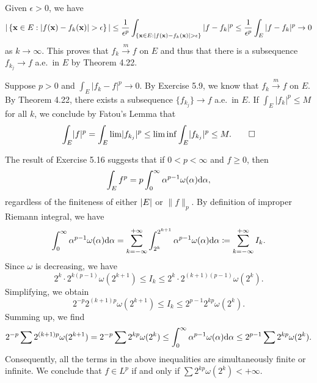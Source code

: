 \begin{exercise}{5.9}
  Given $\epsilon>0$, we have
  \[|\left\{\bfx\in E:|f(\bfx)-f_k(\bfx)|>\epsilon\right\}|\leq\frac{1}{\epsilon^p}\int_{\{\bfx\in E:|f(\bfx)-f_k(\bfx)|>\epsilon\}}|f-f_k|^p\leq\frac{1}{\epsilon^p}\int_E|f-f_k|^p \to 0 \]
  as $k\to\infty$.
  This proves that $f_k\overset{m}{\longrightarrow} f$ on $E$ and thus
  that there is a subsequence $f_{k_j}\to f$ a.e.\ in $E$ by Theorem 4.22.
\end{exercise}

\begin{exercise}{5.10}
  Suppose $p > 0$ and $\int_E \lvert f_k - f \rvert^p \rightarrow 0$.
  By Exercise 5.9, we know that $f_k \xrightarrow{m} f$ on $E$.
  By Theorem 4.22, there exists a subsequence $\{f_{k_j}\} \rightarrow f$ a.e.\ in $E$.
  If $\int_E \lvert f_k \rvert^p \le M$ for all $k$,
  we conclude by Fatou's Lemma that
  \[
    \int_E \lvert f \rvert^p = \int_E \lim \lvert f_{k_j} \rvert^p
    \le \liminf \int_E \lvert f_{k_j} \rvert^p \le M.
    \qedhere
  \]
\end{exercise}

\begin{exercise}{5.18}
  The result of Exercise 5.16 suggests that if $0 < p < \infty$ and $f \ge 0$, then
  \[
    \int_E f^p = p \int_0^{\infty} \alpha^{p-1} \omega(\alpha) \mathrm{d} \alpha,
  \]
  regardless of the finiteness of either $\left\vert E\right\vert$ or $\lVert f \rVert_p$.
  By definition of improper Riemann integral, we have
  \[
    \int_0^\infty \alpha^{p-1} \omega(\alpha) \mathrm{d} \alpha =
    \sum_{k = -\infty}^{+\infty}
    \int_{2^k}^{2^{k+1}} \alpha^{p-1} \omega(\alpha) \mathrm{d} \alpha
    \coloneqq \sum_{k = -\infty}^{+\infty} I_k.
  \]
  Since $\omega$ is decreasing, we have
  \[
    2^k \cdot 2^{k(p-1)} \omega(2^{k+1}) \le I_k \le 2^k \cdot 2^{(k+1)(p-1)} \omega(2^k).
  \]
  Simplifying, we obtain
  \[
    2^{-p} 2^{(k+1)p} \omega(2^{k+1}) \le I_k \le 2^{p-1} 2^{kp} \omega(2^k).
  \]
  Summing up, we find
  \[
    2^{-p} \sum 2^{(k+1)p} \omega(2^{k+1})
    = 2^{-p} \sum 2^{kp} \omega(2^k)
    \le \int_0^\infty \alpha^{p-1} \omega(\alpha) \mathrm{d} \alpha
    \le 2^{p-1} \sum 2^{kp} \omega(2^k).
  \]
  Consequently, all the terms in the above inequalities
  are simultaneously finite or infinite.
  We conclude that $f \in L^p$ if and only if $\sum 2^{kp} \omega(2^k) < + \infty$.
\end{exercise}



